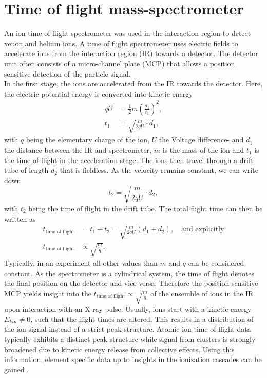 \section{Time of flight mass-spectrometer}\label{sec:TOF-spectrometer}
An ion time of flight spectrometer was used in the interaction region to detect xenon and helium ions. A time of flight spectrometer uses electric fields to accelerate ions from the interaction region (IR) towards a detector. The detector unit often consists of a micro-channel plate (MCP) that allows a position sensitive detection of the particle signal.\\
In the first stage, the ions are accelerated from the IR towards the detector. Here, the electric potential energy is converted into kinetic energy
\begin{align}
q U &= \frac{1}{2}m \left(\frac{d_{1}}{t_{1}}\right)^{2},\\
t_{1} &= \sqrt{\frac{m}{2qU}}\cdot d_{1},
\end{align}
with $q$ being the elementary charge of the ion, $U$ the Voltage difference- and $d_{1}$ the distance between the IR and spectrometer, $m$ is the mass of the ion and $t_{1}$ is the time of flight in the acceleration stage. The ions then travel through a drift tube of length $d_{2}$ that is fieldless. As the velocity remains constant, we can write down
\begin{equation}
t_{2} = \sqrt{\frac{m}{2qU}}\cdot d_{2},
\end{equation}
with $t_{2}$ being the time of flight in the drift tube. The total flight time can then be written as
\begin{align}
t_{\text{time of flight}}&=t_{1}+t_{2}=\sqrt{\frac{m}{2 q U}} \left(d_{1}+d_{2}\right), \quad \text{and explicitly}\\
t_{\text{time of flight}} &\propto \sqrt{\frac{m}{q}}.
\end{align}
Typically, in an experiment all other values than $m$ and $q$ can be considered constant. As the spectrometer is a cylindrical system, the time of flight denotes the final position on the detector and vice versa. Therefore the position sensitive MCP yields insight into the $t_{\text{time of flight}} \propto\sqrt{\frac{m}{q}}$ of the ensemble of ions in the IR upon interaction with an X-ray pulse. Usually, ions start with a kinetic energy $E_{kin}\neq 0$, such that the flight times are altered. This results in a distribution of the ion signal instead of a strict peak structure. Atomic ion time of flight data typically exhibits a distinct peak structure while signal from clusters is strongly broadened due to kinetic energy release from collective effects. Using this information, element specific data up to insights in the ionization cascades can be gained \citep{Ho-2014-PRL}.\\
